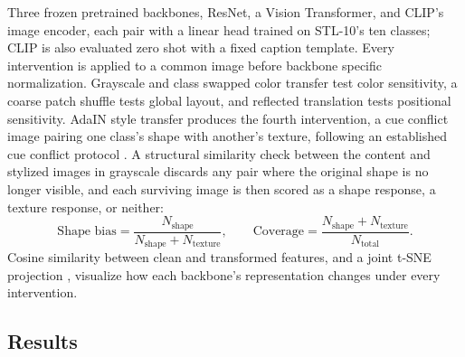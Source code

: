 \documentclass{article}
\begin{document}
Three frozen pretrained backbones, ResNet, a Vision Transformer, and CLIP's
image encoder, each pair with a linear head trained on STL-10's ten
classes; CLIP is also evaluated zero shot with a fixed caption template.
Every intervention is applied to a common image before backbone specific
normalization. Grayscale and class swapped color transfer test color
sensitivity, a coarse patch shuffle tests global layout, and reflected
translation tests positional sensitivity. AdaIN style transfer
\citep{huang2017arbitrary} produces the fourth intervention, a cue conflict
image pairing one class's shape with another's texture, following an
established cue conflict protocol \citep{geirhos2019imagenettrained}. A
structural similarity check between the content and stylized images in
grayscale discards any pair where the original shape is no longer
visible, and each surviving image is then scored as a shape response, a
texture response, or neither:
\begin{equation}
  \text{Shape bias} = \frac{N_{\text{shape}}}{N_{\text{shape}}+N_{\text{texture}}}, \qquad
  \text{Coverage} = \frac{N_{\text{shape}}+N_{\text{texture}}}{N_{\text{total}}}.
  \label{eq:shapebias}
\end{equation}
Cosine similarity between clean and transformed features, and a joint
t-SNE projection \citep{vandermaaten2008visualizing}, visualize how each
backbone's representation changes under every intervention.

\subsection{Results}
\end{document}
